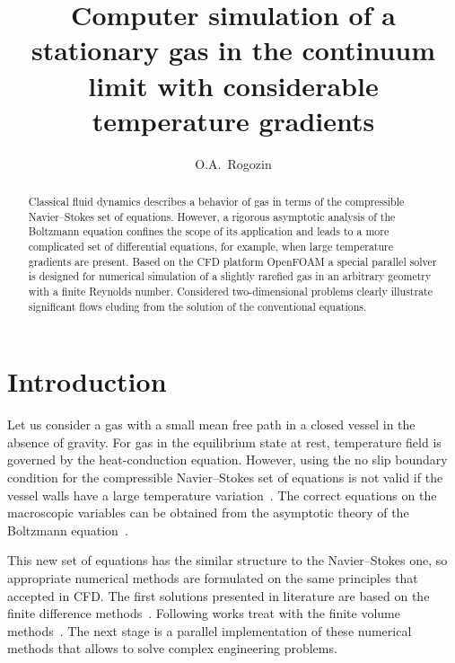 \documentclass[smallextended, referee]{svjour3} %
\begin{document}
\title{
	Computer simulation of a stationary gas in the continuum limit with considerable temperature gradients
}

\author{O.A.~Rogozin}

\maketitle

\begin{abstract}
	Classical fluid dynamics describes a behavior of gas in terms of the compressible Navier--Stokes
	set of equations. However, a rigorous asymptotic analysis of the Boltzmann equation confines
	the scope of its application and leads to a more complicated set of differential equations,
	for example, when large temperature gradients are present. Based on the CFD platform
	OpenFOAM\textregistered{} a special parallel solver is designed for numerical simulation of a slightly rarefied gas
	in an arbitrary geometry with a finite Reynolds number. Considered two-dimensional problems
	clearly illustrate significant flows eluding from the solution of the conventional equations.
\end{abstract}

\section{Introduction}

Let us consider a gas with a small mean free path in a closed vessel in the absence of gravity.
For gas in the equilibrium state at rest, temperature field is governed by the heat-conduction equation.
However, using the no slip boundary condition for the compressible Navier--Stokes set of equations
is not valid if the vessel walls have a large temperature variation~\cite{Kogan1976, GhostEffect}.
The correct equations on the macroscopic variables can be obtained from the asymptotic theory of
the Boltzmann equation~\cite{Sone2002, Sone2007}.

This new set of equations has the similar structure to the Navier--Stokes one,
so appropriate numerical methods are formulated on the same principles that accepted in CFD.
The first solutions presented in literature are based on the finite difference methods~\cite{GhostEffect, SoneCoaxial}.
Following works treat with the finite volume methods~\cite{Laneryd2006, Laneryd2007}.
The next stage is a parallel implementation of these numerical methods that allows
to solve complex engineering problems.
\end{document}
